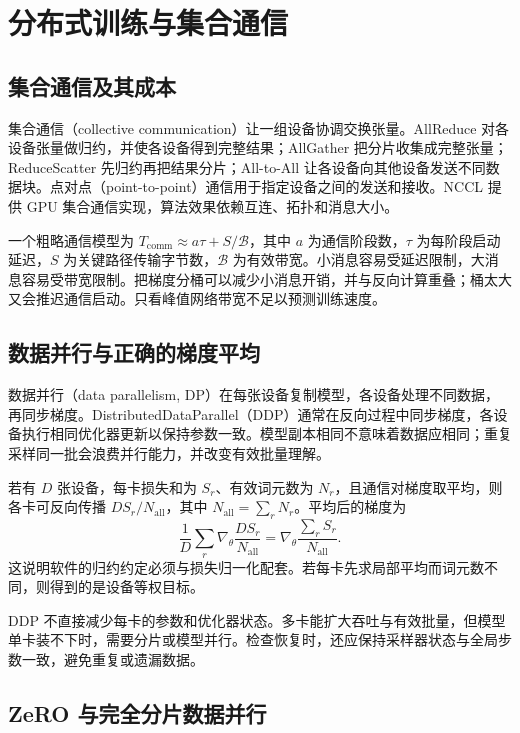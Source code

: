 \setcounter{chapter}{8} %
\chapter{分布式训练与集合通信}
\label{ch:distributed}

\section{集合通信及其成本}

集合通信（collective communication）让一组设备协调交换张量。AllReduce 对各设备张量做归约，并使各设备得到完整结果；AllGather 把分片收集成完整张量；ReduceScatter 先归约再把结果分片；All-to-All 让各设备向其他设备发送不同数据块。点对点（point-to-point）通信用于指定设备之间的发送和接收。NCCL 提供 GPU 集合通信实现，算法效果依赖互连、拓扑和消息大小\cite{nccl}。

一个粗略通信模型为 $T_{\mathrm{comm}}\approx a\tau+S/\mathcal B$，其中 $a$ 为通信阶段数，$\tau$ 为每阶段启动延迟，$S$ 为关键路径传输字节数，$\mathcal B$ 为有效带宽。小消息容易受延迟限制，大消息容易受带宽限制。把梯度分桶可以减少小消息开销，并与反向计算重叠；桶太大又会推迟通信启动。只看峰值网络带宽不足以预测训练速度。

\section{数据并行与正确的梯度平均}

数据并行（data parallelism, DP）在每张设备复制模型，各设备处理不同数据，再同步梯度。DistributedDataParallel（DDP）通常在反向过程中同步梯度，各设备执行相同优化器更新以保持参数一致\cite{ddp}。模型副本相同不意味着数据应相同；重复采样同一批会浪费并行能力，并改变有效批量理解。

若有 $D$ 张设备，每卡损失和为 $S_r$、有效词元数为 $N_r$，且通信对梯度取平均，则各卡可反向传播 $D S_r/N_{\mathrm{all}}$，其中 $N_{\mathrm{all}}=\sum_rN_r$。平均后的梯度为
\[
\frac1D\sum_r\nabla_\theta\frac{D S_r}{N_{\mathrm{all}}}
=\nabla_\theta\frac{\sum_rS_r}{N_{\mathrm{all}}}.
\]
这说明软件的归约约定必须与损失归一化配套。若每卡先求局部平均而词元数不同，则得到的是设备等权目标。

DDP 不直接减少每卡的参数和优化器状态。多卡能扩大吞吐与有效批量，但模型单卡装不下时，需要分片或模型并行。检查恢复时，还应保持采样器状态与全局步数一致，避免重复或遗漏数据。

\section{ZeRO 与完全分片数据并行}

